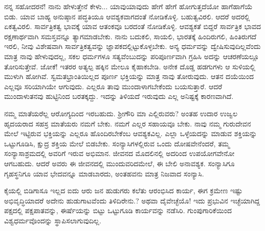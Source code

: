 ನನ್ನ ಸಹೋದರನೆ! ನಾನು ಹೇಳುತ್ತೇನೆ ಕೇಳು... ಯಾವುಯಾವುದು ಹೇಗೆ ಹೇಗೆ ಹೋಗುತ್ತದೆಯೋ ಹಾಗೆಹಾಗೆಯೆ ಬಿಡು. ಯಾವ ಬಾಹ್ಯ ಅನುಷ್ಠಾನ ಪದ್ಧತಿಯೂ ಆವಶ್ಯಕವಾಗದಂತೆ ನೋಡಿಕೊಳ್ಳಿ. ಬಹುತ್ವವಿರಲಿ. ಆದರೆ ಅದರಲ್ಲಿ ಏಕತ್ವ\-ವಿರಲಿ. ಸಾರ್ವತ್ರಿಕತ್ವ ಭಾವಕ್ಕೆ ಯಾವ ಆತಂಕವೂ ಬರದಂತೆ ನೋಡಿಕೊಳ್ಳಿ. ಆವಶ್ಯಕತೆ ಬಿದ್ದರೆ ಸಾರ್ವತ್ರಿಕ ಭಾವದ ರಕ್ಷಣಾರ್ಥವಾಗಿ ಸಮಸ್ತವನ್ನೂ ತ್ಯಾಗಮಾಡಬೇಕು. ನಾನು ಬದುಕಲಿ, ಸಾಯಲಿ, ಭಾರತಕ್ಕೆ ಹಿಂದಿರುಗಲಿ, ಹಿಂತಿರುಗದೆ ಇರಲಿ, ನೀವು ವಿಶೇಷವಾಗಿ ಸಾರ್ವತ್ರಿಕತ್ವವನ್ನು ಜ್ಞಾಪಕದಲ್ಲಿಟ್ಟುಕೊಳ್ಳಬೇಕು. ಅನ್ಯ ಧರ್ಮವನ್ನು ದ್ವೇಷಿಸುವುದಿಲ್ಲವೆಂದು ಮಾತ್ರ ನಾವು ಹೇಳುವುದಲ್ಲ, ಸಕಲ ಧರ್ಮಗಳೂ ಸತ್ಯವೆಂಬುದನ್ನು ಪರಿಪೂರ್ಣವಾಗಿ ಗ್ರಹಿಸಿ ಅದನ್ನು ಆಚರಣೆಯಲ್ಲೂ ತೋರಿಸುತ್ತೇವೆ. ಜೋಕೆ! ಇತರರ ಅತ್ಯಲ್ಪ ಹಕ್ಕಿನ ಮೇಲೂ ಕೈಹಾಕಬೇಡಿ. ಅನೇಕ ದೊಡ್ಡ ಹಡಗುಗಳು ಆ ಸುಳಿಯಲ್ಲಿ ಮುಳುಗಿ ಹೋಗಿವೆ. ಸ್ವಮತಭ್ರಾಂತಿಯಿಲ್ಲದ ಪೂರ್ಣ ಭಕ್ತಿಯನ್ನು ಮಾತ್ರ ನಾವು ತೋರುವುದು. ಆತನ ದಯೆಯಿಂದ ಎಲ್ಲವೂ ಸರಿಯಾಗಿಯೇ ಆಗುವುದು. ಎಲ್ಲರೂ ತಾವು ಮುಂದಾಳಾಗಬೇಕೆಂದು ಬಯಸುತ್ತಾರೆ. ಆದರೆ ಮುಂದಾಳುತನವು ಹುಟ್ಟಿನಿಂದ ಬರತಕ್ಕದ್ದು. ಇದನ್ನು ತಿಳಿಯದೆ ಇರುವುದು ಎಲ್ಲ ಅನಿಷ್ಟಕ್ಕೆ ಕಾರಣವಾಗಿದೆ.

ನಮ್ಮ ಮಾತೆಯರೆಲ್ಲ ಆರೋಗ್ಯದಿಂದ ಇರಬಹುದು. ಶ‍್ರೀಗೌರಿ ಮಾ ಎಲ್ಲಿರುವರು? ಅಂತಹ ಉದಾರ ಉಜ್ವಲ ಹೃದಯರಾದ ಸಹಸ್ರ ಮಾತೆಯರು ನಮಗೆ ಬೇಕು. ನಮಗೆ ಎಲ್ಲರ ಸಹಾಯವೂ ಬೇಕು. ನಾವು ನಮ್ಮ ಗುರುದೇವನ ಮೇಲೆ ಇಟ್ಟಿರುವ ಭಕ್ತಿಯನ್ನು ಎಲ್ಲರೂ ಹೊಂದಿರಬೇಕೆಂಬ ಆವಶ್ಯಕವಿಲ್ಲ. ಎಲ್ಲಾ ಒಳ್ಳೆಯದನ್ನು ಮಾಡುವ ಶಕ್ತಿಯನ್ನು ಒಟ್ಟುಗೂಡಿಸಿ, ಕ್ಷುದ್ರ ಶಕ್ತಿಯ ಮೇಲೆ ಬಿಡಬೇಕು. ಸಂನ್ಯಾಸಿಗಳಲ್ಲಿರುವ ಒಂದು ದೋಷವೇನೆಂದರೆ, ತಮ್ಮ ಸಂನ್ಯಾಸಾಶ್ರಮದಲ್ಲಿ ಅವರಿಗೆ ಇರುವ ಅಭಿಮಾನ. ಜೀವನದ ಮೊದಲಿನಲ್ಲಿ ಅದರಿಂದ ಉಪಯೋಗವೇನೋ ಆಗಬಹುದು. ಆದರೆ ಅವರು ಈ ಜೀವನದಲ್ಲಿ ಮುಂದುವರಿದಮೇಲೆ, ಈ ಬೇಲಿ ಅನಾವಶ್ಯಕ. ಸಂನ್ಯಾಸಿಗೂ ಗೃಹಸ್ಥನಿಗೂ ಯಾವ ಭೇದವನ್ನೂ ಮಾಡಬಾರದು, ಅಂತಹವನು ಮಾತ್ರ ನಿಜವಾದ ಸಂನ್ಯಾಸಿ.

ಕೈಯಲ್ಲಿ ಬಿಡಿಗಾಸೂ ಇಲ್ಲದ ಐದು ಆರು ಜನ ಹುಡುಗರು ಕಲೆತು ಆರಂಭಿಸಿದ ಕಾರ್ಯ, ಈಗ ಕ್ರಮೇಣ ಇಷ್ಟು ಅಭಿವೃದ್ಧಿಯಾದರೆ ಅದೇನು ಹುಡುಗಾಟವೆಂದು ತಿಳಿದಿರೇನು.? ಅಥವಾ ದೈವೇಚ್ಛೆಯೊ! ಇದು ಪ್ರಭುವಿನ ಇಚ್ಛೆಯಾಗಿದ್ದ ಪಕ್ಷದಲ್ಲಿ ಪಕ್ಷಪಾತವನ್ನು, ಈರ್ಷೆಯನ್ನು ಬಿಟ್ಟು ಒಟ್ಟುಗೂಡಿ ಕಾರ್ಯವನ್ನು ನಡೆಸಿರಿ. ಗುಂಪುಗಾರಿಕೆಯಿಂದ ವಿಶ್ವಧರ್ಮವೊಂದನ್ನು ಸ್ಥಾಪಿಸಲಾಗುವುದಿಲ್ಲ.

{\fontsize{12.5}{10}\selectfont{
ಒಬ್ಬನು ದೊಡ್ಡವನಾಗಬೇಕೆಂದು ನೆನೆದ ಮಾತ್ರಕ್ಕೆ ಅವನು ದೊಡ್ಡವನಾಗಲಾರ. ಭಗವಂತ ಯಾರನ್ನು ಕೈನೀಡಿ ಮೇಲಕ್ಕೆ ಎತ್ತುತ್ತಾನೋ ಅವನು ಮಾತ್ರವೇ ಮೇಲಕ್ಕೆ ಏಳುವನು. ಅವನು ಯಾರನ್ನು ಕೆಳಕ್ಕೆ ತಳ್ಳುತ್ತಾನೋ ಅವನು ಬೀಳುವನು. ಇದನ್ನು ಜನರೆಲ್ಲರೂ ಒಂದು ದಿನ ಒಂದು ನಿಮಿಷವಾದರೂ ನೆನೆದರೆ ಆಗ ಎಲ್ಲ ತೊಂದರೆಗಳೂ ಅಡಗುವುವು. ಆದರೆ ಆ ಕೆಲಸಕ್ಕೆ ಬಾರದ ಅಹಂಕಾರವಿದೆಯಲ್ಲ! ಒಂದು ಬೆರಳನ್ನು ಕೂಡ ಅಲ್ಲಾಡಿಸಲು ಶಕ್ತಿಯಿಲ್ಲ. ಆದರೂ ಕೂಡ ನಾನು ಯಾರನ್ನೂ ಏಳಗೊಡುವುದಿಲ್ಲ ಎನ್ನ ಬೇಕಾದರೆ ಎಷ್ಟು ನಾಚಿಕೆಗೇಡು? ಅಸೂಯೆ, ನಾಲ್ವರು ಸೇರಿ ಒಂದು ಕೆಲಸವನ್ನು ಮಾಡೋಣ ಎಂಬ ಒಗ್ಗಟ್ಟಿನ ಅಭಾವ, ಇವು ಗುಲಾಮ ಜಾತಿಯವರ ಸ್ವಭಾವ. ಆದರೆ ನಾವು ಇವುಗಳಿಂದ ಪಾರಾಗುವುದಕ್ಕೆ ಪ್ರಯತ್ನಿಸಬೇಕು. ಭಯಾನಕವಾದ ಈರ್ಷೆ ನಮ್ಮ ವಿಶೇಷ ಲಕ್ಷಣ. ಪರದೇಶಗಳಿಗೆ ಹೋಗಿ ಅವುಗಳೊಂದಿಗೆ ಹೋಲಿಸಿ ನೋಡಿದಾಗ ಗೊತ್ತಾಗುವುದು. ಈ ವಿಷಯದಲ್ಲಿ ನಮ್ಮನ್ನು ಹೋಲುವವರು ಯಾರೆಂದರೆ, ಅಮೆರಿಕದ ವಿಮುಕ್ತರಾದ ನೀಗ್ರೋ ಜನರು. ಅವರಲ್ಲಿ ಯಾವನಾದರೊಬ್ಬ ಕೊಂಚ ತಲೆಎತ್ತಿದರೆ ಸಾಕು, ಎಲ್ಲರೂ ಒಡನೆಯೇ ಕಲೆತು, ಅವನಿಗೆ ವಿರುದ್ಧವಾಗಿ ಬಿಳಿಯವರೊಡನೆ ಸೇರಿಕೊಂಡು, ಅವನನ್ನು ನೆಲಕ್ಕೆ ತುಳಿಯುವುದಕ್ಕೆ ಪ್ರಯತ್ನಪಡುವರು.}}


